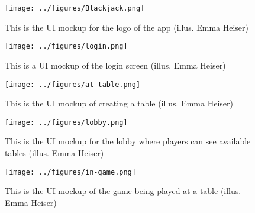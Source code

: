 \begin{figure}[hbt!]
    \centering
    \texttt{[image: ../figures/Blackjack.png]} \\
    \caption{This is the UI mockup for the logo of the app (illus. Emma Heiser)}
    \label{fig:logo}
\end{figure}

\begin{figure}[hbt!]
    \centering
    \texttt{[image: ../figures/login.png]}
    \caption{This is a UI mockup of the login screen (illus. Emma Heiser)}
    \label{fig:login}
\end{figure}

\begin{figure}[hbt!]
    \centering
    \texttt{[image: ../figures/at-table.png]}
    \caption{This is the UI mockup of creating a table (illus. Emma Heiser)}
    \label{fig:table}
\end{figure}

\pagebreak

\begin{figure}[hbt!]
    \centering
    \texttt{[image: ../figures/lobby.png]}
    \caption{This is the UI mockup for the lobby where players can see available tables (illus. Emma Heiser)}
    \label{fig:lobby}
\end{figure}

\begin{figure}[hbt!]
    \centering
    \texttt{[image: ../figures/in-game.png]}
    \caption{This is the UI mockup of the game being played at a table (illus. Emma Heiser)}
    \label{fig:game}
\end{figure}

\pagebreak
